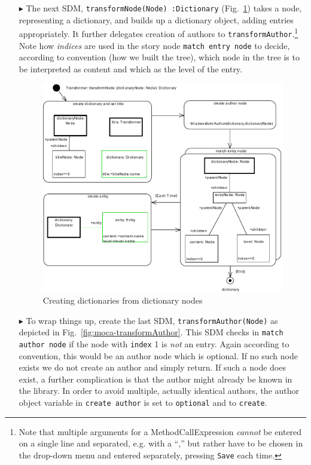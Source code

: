 \begin{enumerate}
\item[$\blacktriangleright$] The next SDM, \texttt{transformNode(Node)~:Dic\-tion\-ary} (Fig.~\ref{fig:moca-transformNode}) takes a node, representing a dictionary, and builds up a dictionary object, adding entries appropriately.
It further delegates creation of authors to \texttt{transformAuthor}.\footnote{Note that multiple arguments for a MethodCallExpression \emph{cannot} be entered on a single line and separated, e.g. with a ``,'' but rather have to be chosen in the drop-down menu and entered separately, pressing \texttt{Save} each time.}
Note how \emph{indices} are used in the story node \texttt{match entry node} to decide, according to convention (how we built the tree), which node in the tree is to be interpreted as content and which as the level of the entry.
\begin{figure}[!htbp]
\begin{center}
 \includegraphics[width=\textwidth]{pics/moca/3MocaTreeToModel/transformNodePrintPdf}
  \caption{Creating dictionaries from dictionary nodes} 
  \label{fig:moca-transformNode}
\end{center}
\end{figure}

\item[$\blacktriangleright$] To wrap things up, create the last SDM, \texttt{trans\-form\-Author(Node)} as depicted in Fig.~\ref{fig:moca-transformAuthor}.
This SDM checks in \texttt{match author node} if the node with \texttt{index} 1 is \emph{not} an entry.
Again according to convention, this would be an author node which is optional.
If no such node exists we do not create an author and simply return.
If such a node does exist, a further complication is that the author might already be known in the library.
In order to avoid multiple, actually identical authors, the author object variable in \texttt{create author} is set to \texttt{optional} and to \texttt{create}.
 

\end{enumerate}

